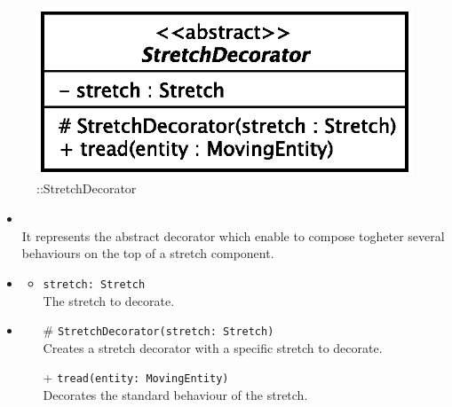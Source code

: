 \begin{figure}[h]
\centering
\includegraphics[scale=0.6,keepaspectratio]{images/solution/stretch_decorator.eps}
\caption{\pReactiveComponentStretchDecoration::StretchDecorator}
\label{fig:sd-app-stretch_decorator}
\end{figure}
\FloatBarrier
\begin{itemize}
  \item \textbf{\descr} \\
    It represents the abstract decorator which enable to compose togheter several
behaviours on the top of a stretch component. 
  \item \textbf{\attrs}
  \begin{itemize}
    \item \texttt{stretch: Stretch} \\
The stretch to decorate.
  \end{itemize}
  \item \textbf{\ops}
   \begin{itemize} 
   \item[\#] \texttt{StretchDecorator(stretch: Stretch)} \\
Creates a stretch decorator with a specific stretch to decorate.
    \item[+] \texttt{tread(entity: MovingEntity)} \\
Decorates the standard behaviour of the stretch.  
  \end{itemize}
\end{itemize}
